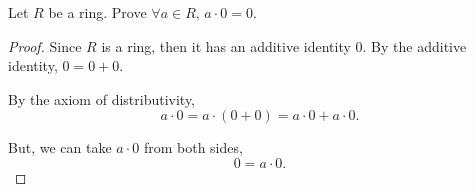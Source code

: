 \documentclass[../hw3]{subfiles}
\begin{document}
\begin{problem}
Let $R$ be a ring. Prove  $\forall a\in R,\,  a\cdot 0 = 0$.
\end{problem}
\begin{proof}
	Since $R$ is a ring, then it has an additive identity 0.
	By the additive identity, $0=0+0$.

	By the axiom of distributivity, \[
		a\cdot 0 = a\cdot (0+0)=a\cdot 0 + a\cdot 0
		.\]

	But, we can take $a\cdot 0$ from both sides, \[
		0=a\cdot 0
		.\]
\end{proof}
\end{document}
